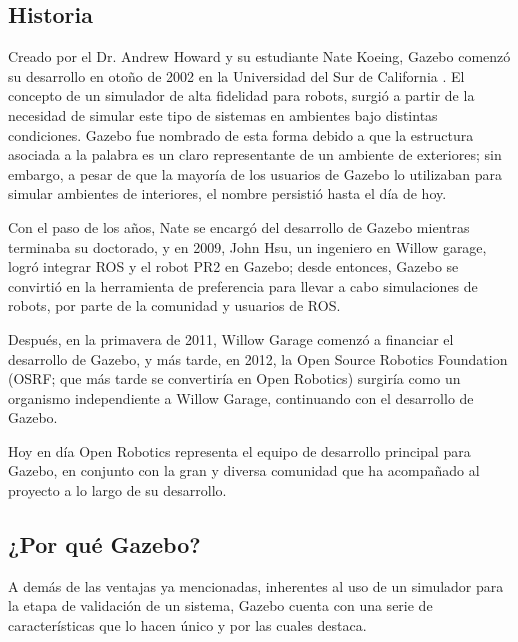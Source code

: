 \subsection{Historia}
Creado por el Dr. Andrew Howard y su estudiante Nate Koeing, Gazebo comenzó su desarrollo en otoño de 2002 en la Universidad del Sur de California \cite{gazebo_2014}. El concepto de un simulador de alta fidelidad para robots, surgió a partir de la necesidad de simular este tipo de sistemas en ambientes bajo distintas condiciones. Gazebo fue nombrado de esta forma debido a que la estructura asociada a la palabra es un claro representante de un ambiente de exteriores; sin embargo, a pesar de que la mayoría de los usuarios de Gazebo lo utilizaban para simular ambientes de interiores, el nombre persistió hasta el día de hoy.

Con el paso de los años, Nate se encargó del desarrollo de Gazebo mientras terminaba su doctorado, y en 2009, John Hsu, un ingeniero en Willow garage, logró integrar ROS y el robot PR2 en Gazebo; desde entonces, Gazebo se convirtió en la herramienta de preferencia para llevar a cabo simulaciones de robots, por parte de la comunidad y usuarios de ROS.

Después, en la primavera de 2011, Willow Garage comenzó a financiar el desarrollo de Gazebo, y más tarde, en 2012, la Open Source Robotics Foundation (OSRF; que más tarde se convertiría en Open Robotics) surgiría como un organismo independiente a Willow Garage, continuando con el desarrollo de Gazebo. 

Hoy en día Open Robotics representa el equipo de desarrollo principal para Gazebo, en conjunto con la gran y diversa comunidad que ha acompañado al proyecto a lo largo de su desarrollo.

\subsection{¿Por qué Gazebo?}
A demás de las ventajas ya mencionadas, inherentes al uso de un simulador para la etapa de validación de un sistema, Gazebo cuenta con una serie de características que lo hacen único y por las cuales destaca.

